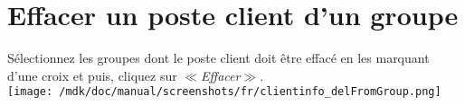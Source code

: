 \section{Effacer un poste client d'un groupe}S\'electionnez les groupes dont le poste client doit \^etre effac\'e en les marquant d'une croix et puis, cliquez sur \textit{$\ll$Effacer$\gg$}.\\
\texttt{[image: /mdk/doc/manual/screenshots/fr/clientinfo\_delFromGroup.png]} \\
